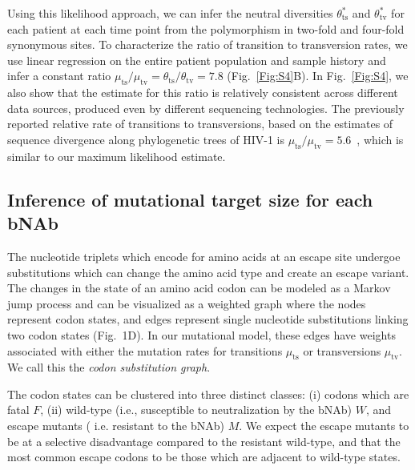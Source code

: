 \documentclass[11pt]{article}
\newcommand{\ts}{{\text{ts}}}
\newcommand{\tv}{{\text{tv}}}
\begin{document}
Using this likelihood approach, we can infer the neutral diversities $\theta^*_{\ts}$ and $\theta^*_{\tv}$ for each patient at each time point from the polymorphism in two-fold and four-fold synonymous sites. To characterize the ratio of transition to transversion rates,  we use linear regression on the entire patient population and sample history and infer a constant ratio $\mu_{\ts}/\mu_{\tv} = \theta_{\ts}/\theta_{\tv} = 7.8$ (Fig.~\ref{Fig:S4}B). In Fig.~\ref{Fig:S4}, we also show that the estimate for this ratio  is relatively consistent across different data sources, produced  even by different sequencing technologies. The previously reported relative rate of transitions to transversions,  based on the estimates of sequence divergence along phylogenetic trees of HIV-1 is $\mu_{\ts}/\mu_{\tv}= 5.6$~\cite{Zanini:2017in}, which is similar to our maximum likelihood estimate.



\subsection{Inference of mutational target size for each bNAb}
\label{sec:mut_target}
The nucleotide triplets which encode for amino acids at an escape site 
	undergoe substitutions which can change the amino acid type
	and create an escape variant.
The changes in the state of an amino acid  codon can be modeled as a Markov jump process 
	and can be visualized as a weighted graph where 
	the nodes represent codon states, and edges represent single nucleotide substitutions
	linking two codon states (Fig.~1D).
In our mutational model, these edges have weights associated with either the mutation rates for transitions $\mu_{\ts}$ or transversions $\mu_{\tv}$. We call this the {\em codon substitution graph}.

The codon states can be clustered into three distinct classes: (i) codons which are fatal $F$,  (ii) wild-type (i.e., susceptible to neutralization by the bNAb) $W$, and escape mutants ( i.e. resistant to the bNAb) $M$.
We expect the escape mutants to be at a selective disadvantage compared to  the resistant wild-type, and that the most common escape codons to be those which are adjacent to wild-type states. 
	
\end{document}
